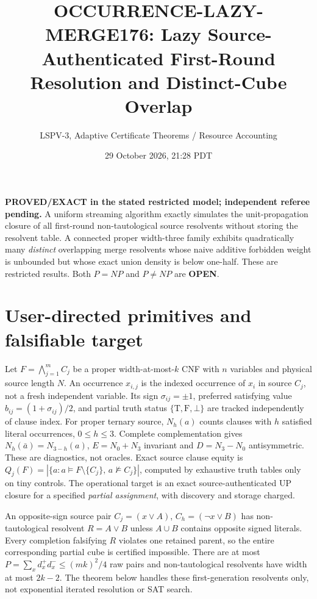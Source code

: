 \documentclass[11pt]{article}
\title{OCCURRENCE-LAZY-MERGE176: Lazy Source-Authenticated First-Round Resolution and Distinct-Cube Overlap}
\author{LSPV-3, Adaptive Certificate Theorems / Resource Accounting}
\date{29 October 2026, 21:28 PDT}
\begin{document}
\maketitle
\noindent \textbf{PROVED/EXACT in the stated restricted model; independent referee pending.} A uniform streaming algorithm exactly simulates the unit-propagation closure of all first-round non-tautological source resolvents without storing the resolvent table. A connected proper width-three family exhibits quadratically many \emph{distinct} overlapping merge resolvents whose naive additive forbidden weight is unbounded but whose exact union density is below one-half. These are restricted results. Both $P=NP$ and $P\ne NP$ are \textbf{OPEN}.
\section{User-directed primitives and falsifiable target}
Let $F=\bigwedge_{j=1}^m C_j$ be a proper width-at-most-$k$ CNF with $n$ variables and physical source length $N$. An occurrence $x_{i,j}$ is the indexed occurrence of $x_i$ in source $C_j$, not a fresh independent variable. Its sign $\sigma_{ij}=\pm1$, preferred satisfying value $b_{ij}=(1+\sigma_{ij})/2$, and partial truth status $\{\mathrm{T},\mathrm{F},\bot\}$ are tracked independently of clause index. For proper ternary source, $N_h(a)$ counts clauses with $h$ satisfied literal occurrences, $0\le h\le3$. Complete complementation gives $N_h(\bar a)=N_{3-h}(a)$, $E=N_0+N_3$ invariant and $D=N_3-N_0$ antisymmetric. These are diagnostics, not oracles. Exact source clause equity is $Q_j(F)=|\{a:a\models F\setminus\{C_j\},\,a\not\models C_j\}|$, computed by exhaustive truth tables only on tiny controls. The operational target is an exact source-authenticated UP closure for a specified \emph{partial assignment}, with discovery and storage charged.

An opposite-sign source pair $C_j=(x\lor A)$, $C_h=(\neg x\lor B)$ has non-tautological resolvent $R=A\lor B$ unless $A\cup B$ contains opposite signed literals. Every completion falsifying $R$ violates one retained parent, so the entire corresponding partial cube is certified impossible. There are at most $P=\sum_xd_x^+d_x^-\le(mk)^2/4$ raw pairs and non-tautological resolvents have width at most $2k-2$. The theorem below handles these first-generation resolvents only, not exponential iterated resolution or SAT search.
\end{document}
